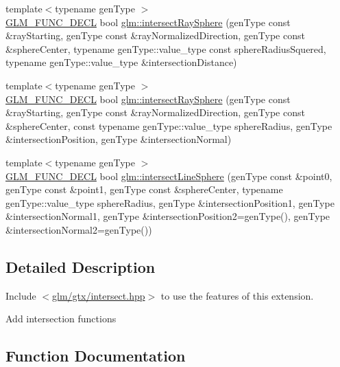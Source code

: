 \begin{DoxyCompactItemize}
\item 
{\footnotesize template$<$typename gen\+Type $>$ }\\\mbox{\hyperlink{setup_8hpp_ab2d052de21a70539923e9bcbf6e83a51}{G\+L\+M\+\_\+\+F\+U\+N\+C\+\_\+\+D\+E\+CL}} bool \mbox{\hyperlink{group__gtx__intersect_gac88f8cd84c4bcb5b947d56acbbcfa56e}{glm\+::intersect\+Ray\+Sphere}} (gen\+Type const \&ray\+Starting, gen\+Type const \&ray\+Normalized\+Direction, gen\+Type const \&sphere\+Center, typename gen\+Type\+::value\+\_\+type const sphere\+Radius\+Squered, typename gen\+Type\+::value\+\_\+type \&intersection\+Distance)
\item 
{\footnotesize template$<$typename gen\+Type $>$ }\\\mbox{\hyperlink{setup_8hpp_ab2d052de21a70539923e9bcbf6e83a51}{G\+L\+M\+\_\+\+F\+U\+N\+C\+\_\+\+D\+E\+CL}} bool \mbox{\hyperlink{group__gtx__intersect_gad28c00515b823b579c608aafa1100c1d}{glm\+::intersect\+Ray\+Sphere}} (gen\+Type const \&ray\+Starting, gen\+Type const \&ray\+Normalized\+Direction, gen\+Type const \&sphere\+Center, const typename gen\+Type\+::value\+\_\+type sphere\+Radius, gen\+Type \&intersection\+Position, gen\+Type \&intersection\+Normal)
\item 
{\footnotesize template$<$typename gen\+Type $>$ }\\\mbox{\hyperlink{setup_8hpp_ab2d052de21a70539923e9bcbf6e83a51}{G\+L\+M\+\_\+\+F\+U\+N\+C\+\_\+\+D\+E\+CL}} bool \mbox{\hyperlink{group__gtx__intersect_ga9c68139f3d8a4f3d7fe45f9dbc0de5b7}{glm\+::intersect\+Line\+Sphere}} (gen\+Type const \&point0, gen\+Type const \&point1, gen\+Type const \&sphere\+Center, typename gen\+Type\+::value\+\_\+type sphere\+Radius, gen\+Type \&intersection\+Position1, gen\+Type \&intersection\+Normal1, gen\+Type \&intersection\+Position2=gen\+Type(), gen\+Type \&intersection\+Normal2=gen\+Type())
\end{DoxyCompactItemize}


\subsection{Detailed Description}
Include $<$\mbox{\hyperlink{intersect_8hpp}{glm/gtx/intersect.\+hpp}}$>$ to use the features of this extension.

Add intersection functions 

\subsection{Function Documentation}
\mbox{\label{group__gtx__intersect_ga9c68139f3d8a4f3d7fe45f9dbc0de5b7}} 
